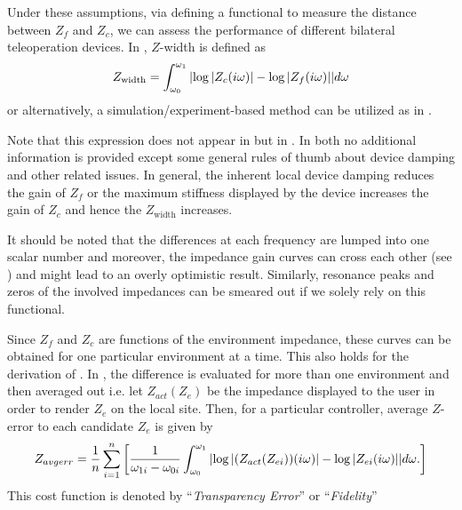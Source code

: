 Under these assumptions, via defining a functional to measure the distance between $Z_f$ and $Z_c$, we can assess the performance
of different bilateral teleoperation devices. In \cite{goranthesis}, $Z$-width is defined as 
\begin{equation}
Z_{\text{width}} = \int_{\omega_0}^{\omega_1}{\displaystyle \left|\log|Z_{\vphantom{f}c}(i\omega)|-\log |Z_f(i\omega)|\right|}d\omega
\label{eq:zwidth}
\end{equation}
or alternatively, a simulation/experiment-based method can be utilized as in \cite{weir}. 


Note that this expression does not appear in \cite{colgate4} but in \cite{goranthesis,passenberg}. In both \cite{colgate4,
goranthesis} no additional information is provided except some general rules of thumb about device damping and other
related issues. In general, the inherent local device damping reduces the gain of $Z_f$ or the maximum stiffness displayed by the 
device increases the gain of $Z_c$ and hence the $Z_{\text{width}}$ increases.

It should be noted that the differences at each frequency are lumped into one scalar number and moreover, the impedance gain curves can
cross each other (see \cite{goranthesis}) and might lead to an overly optimistic result. Similarly, resonance peaks and zeros of the
involved impedances can be smeared out if we solely rely on this functional. 

Since $Z_f$ and $Z_c$ are functions of the environment impedance, these curves can be obtained for one particular environment
at a time. This also holds for the derivation of \cite{lawrence}. In \cite{goranthesis}, the difference  is evaluated for more 
than one environment and then averaged out i.e. let $Z_{act}(Z_e)$ be the impedance displayed to the user in order to render 
$Z_e$ on the local site. Then, for a particular controller, average $Z$-error to each candidate $Z_e$ is given by
\begin{equation}
Z_{avgerr} = \frac{1}{n}\sum_{i=1}^n{\left[
    \frac{1}{\omega_{1i}-\omega_{0i}}\int_{\omega_0}^{\omega_1}{%
                                     \abs{\log|(Z_{act}(Z_{ei}))(\iw)|-\log |Z_{ei}(\iw)|}}d\omega.
                                     \right]}
\label{eq:zdiff}
\end{equation}
This cost function is denoted by \enquote{\emph{Transparency Error}} or \enquote{\emph{Fidelity}}


